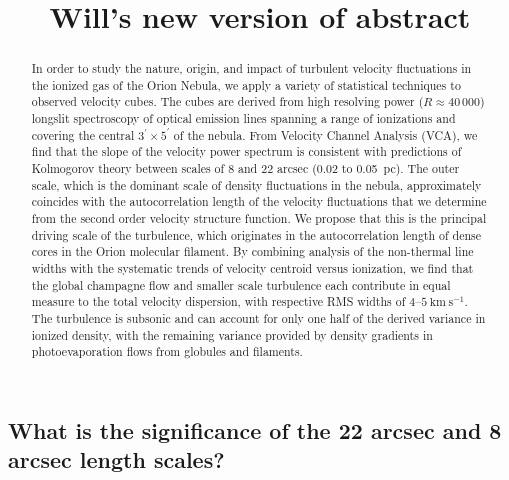 \documentclass[useAMS,usenatbib]{mnras}
\title{Will's new version of abstract}
\newcommand\kms{\ensuremath{\mathrm{km\ s^{-1}}}}
\begin{document}
\maketitle

\begin{abstract}
  In order to study the nature, origin, and impact of turbulent
  velocity fluctuations in the ionized gas of the Orion Nebula, we
  apply a variety of statistical techniques to observed velocity
  cubes.  The cubes are derived from high resolving power
  (\(R \approx 40\,000\)) longslit spectroscopy of optical emission
  lines spanning a range of ionizations and covering the central
  $3^\prime \times 5^\prime$ of the nebula. From Velocity Channel
  Analysis (VCA), we find that the slope of the velocity power
  spectrum is consistent with predictions of Kolmogorov theory between
  scales of 8 and 22 arcsec (0.02 to 0.05~pc).  The outer scale, which
  is the dominant scale of density fluctuations in the nebula,
  approximately coincides with the autocorrelation length of the
  velocity fluctuations that we determine from the second order
  velocity structure function.  We propose that this is the principal
  driving scale of the turbulence, which originates in the
  autocorrelation length of dense cores in the Orion molecular
  filament.  By combining analysis of the non-thermal line widths with
  the systematic trends of velocity centroid versus ionization, we
  find that the global champagne flow and smaller scale turbulence
  each contribute in equal measure to the total velocity dispersion,
  with respective RMS widths of \(4\)--\(5~\kms\).  The turbulence is
  subsonic and can account for only one half of the derived variance
  in ionized density, with the remaining variance provided by density
  gradients in photoevaporation flows from globules and filaments.
\end{abstract}

\addtocounter{section}{4}
\addtocounter{subsection}{2}
\subsection{What is the significance of the 22 arcsec and 8 arcsec
  length scales?}
\label{sec:what-significance-22}
\end{document}
